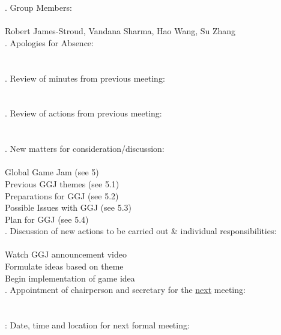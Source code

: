 \documentclass{article}
\begin{document}
. Group Members: \\\\ \indent Robert James-Stroud, Vandana Sharma, Hao Wang, Su Zhang \\

. Apologies for Absence: \\\\ \indent   \\

. Review of minutes from previous meeting: \\\\ \indent  \\

. Review of actions from previous meeting: \\\\ \indent \\

. New matters for consideration/discussion: \\\\  Global Game Jam (see 5)\\ \indent Previous GGJ themes (see 5.1) \\ \indent Preparations for GGJ (see 5.2) \\ \indent Possible Issues with GGJ (see 5.3)\\ \indent Plan for GGJ (see 5.4)\\

. Discussion of new actions to be carried out \& individual responsibilities: \\\\ \indent Watch GGJ announcement video \\ \indent Formulate ideas based on theme \\ \indent Begin implementation of game idea\\ 

. Appointment of chairperson and secretary for the \underline{next} meeting: \\\\ \indent  \\

: Date, time and location for next formal meeting: \\\\ \indent  \\
\end{document}
